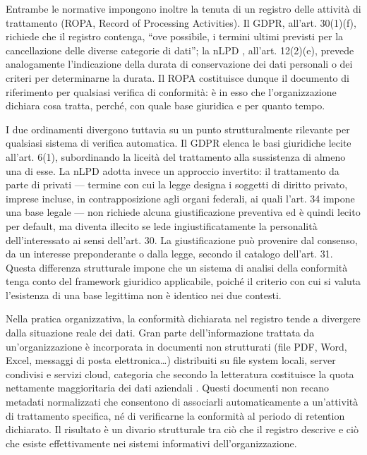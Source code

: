 Entrambe le normative impongono inoltre la tenuta di un registro delle attività di trattamento (ROPA, Record of Processing Activities). Il GDPR, all’art. 30(1)(f), richiede che il registro contenga, “ove possibile, i termini ultimi previsti per la cancellazione delle diverse categorie di dati”; la nLPD \cite{RS2351Legge}, all’art. 12(2)(e), prevede analogamente l’indicazione della durata di conservazione dei dati personali o dei criteri per determinarne la durata. Il ROPA costituisce dunque il documento di riferimento per qualsiasi verifica di conformità: è in esso che l’organizzazione dichiara cosa tratta, perché, con quale base giuridica e per quanto tempo.

I due ordinamenti divergono tuttavia su un punto strutturalmente rilevante per qualsiasi sistema di verifica automatica. Il GDPR elenca le basi giuridiche lecite all’art. 6(1), subordinando la liceità del trattamento alla sussistenza di almeno una di esse. La nLPD adotta invece un approccio invertito: il trattamento da parte di privati — termine con cui la legge designa i soggetti di diritto privato, imprese incluse, in contrapposizione agli organi federali, ai quali l’art. 34 impone una base legale — non richiede alcuna giustificazione preventiva ed è quindi lecito per default, ma diventa illecito se lede ingiustificatamente la personalità dell’interessato ai sensi dell’art. 30. La giustificazione può provenire dal consenso, da un interesse preponderante o dalla legge, secondo il catalogo dell’art. 31. Questa differenza strutturale impone che un sistema di analisi della conformità tenga conto del framework giuridico applicabile, poiché il criterio con cui si valuta l’esistenza di una base legittima non è identico nei due contesti.

Nella pratica organizzativa, la conformità dichiarata nel registro tende a divergere dalla situazione reale dei dati. Gran parte dell’informazione trattata da un’organizzazione è incorporata in documenti non strutturati (file PDF, Word, Excel, messaggi di posta elettronica…) distribuiti su file system locali, server condivisi e servizi cloud, categoria che secondo la letteratura costituisce la quota nettamente maggioritaria dei dati aziendali \cite{gandomiHypeBigData2015}. Questi documenti non recano metadati normalizzati che consentono di associarli automaticamente a un’attività di trattamento specifica, né di verificarne la conformità al periodo di retention dichiarato. Il risultato è un divario strutturale tra ciò che il registro descrive e ciò che esiste effettivamente nei sistemi informativi dell’organizzazione.

